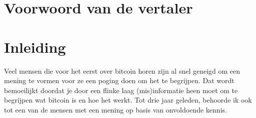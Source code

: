 \documentclass[smalldemyvopaper,11pt,twoside,onecolumn,openright,extrafontsizes]{memoir}
\begin{document}
\setcounter{footnote}{0}

\clearpage

\paragraph{}
\paragraph{}
\paragraph{}
\paragraph{}
\begin{center}
\itshape{}
\end{center}

\cleardoublepage
\normalfont

\cleardoublepage
\setcounter{tocdepth}{0}
\tableofcontents*
\clearpage


\chapter{Voorwoord van de vertaler}

\chapter{Inleiding}

Veel mensen die voor het eerst over bitcoin horen zijn al snel geneigd om een mening te vormen voor ze een poging doen om het te begrijpen. Dat wordt bemoeilijkt doordat je door een flinke laag (mis)informatie heen moet om te begrijpen wat bitcoin is en hoe het werkt. Tot drie jaar geleden, behoorde ik ook tot een van de mensen met een mening op basis van onvoldoende kennis.
\end{document}
